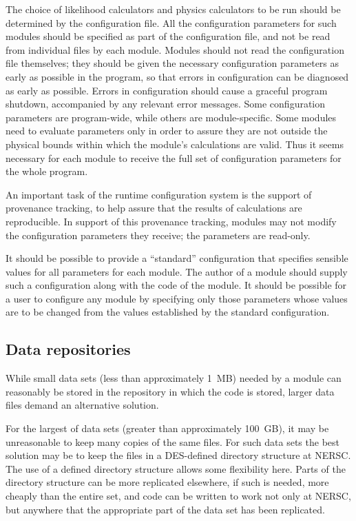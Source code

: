 \documentclass[draftmode,draftwater]{memarticle}
\begin{document}
The choice of likelihood calculators and physics calculators to be run
should be determined by the configuration file. All the configuration
parameters for such modules should be specified as part of the
configuration file, and not be read from individual files by each
module. Modules should not read the configuration file themselves; they
should be given the necessary configuration parameters as early as
possible in the program, so that errors in configuration can be
diagnosed as early as possible. Errors in configuration should cause a
graceful program shutdown, accompanied by any relevant error messages.
Some configuration parameters are program-wide, while others are
module-specific. Some modules need to evaluate parameters only in order
to assure they are not outside the physical bounds within which the
module's calculations are valid. Thus it seems necessary for each module
to receive the full set of configuration parameters for the whole
program.

An important task of the runtime configuration system is the support of
provenance tracking, to help assure that the results of calculations are
reproducible. In support of this provenance tracking, modules may not
modify the configuration parameters they receive; the parameters are
read-only.

It should be possible to provide a ``standard'' configuration that
specifies sensible values for all parameters for each module. The author
of a module should supply such a configuration along with the code of
the module. It should be possible for a user to configure any module by
specifying only those parameters whose values are to be changed from the
values established by the standard configuration.

\subsection{Data repositories}

While small data sets (less than approximately 1~MB) needed by a module can
reasonably be stored in the repository in which the code is stored,
larger data files demand an alternative solution.

For the largest of data sets (greater than approximately 100~GB), it may
be unreasonable to keep many copies of the same files. For such data
sets the best solution may be to keep the files in a DES-defined
directory structure at NERSC. The use of a defined directory structure
allows some flexibility here. Parts of the directory structure can be
more replicated elsewhere, if such is needed, more cheaply than the
entire set, and code can be written to work not only at NERSC, but
anywhere that the appropriate part of the data set has been replicated.
\end{document}

